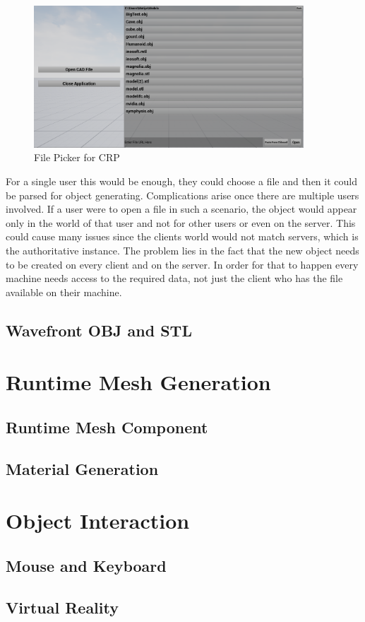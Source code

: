 \begin{figure}[htpb]
	\centering
	\includegraphics[width=0.9\textwidth]{fig/FilePicker2.png}
	\caption[CAD Runtime Presenter File Picker]{File Picker for CRP\protect}
	\label{fig:FilePicker}
\end{figure}

For a single user this would be enough, they could choose a file and then it could be parsed for object generating. Complications arise once there are multiple users involved. If a user were to open a file in such a scenario, the object would appear only in the world of that user and not for other users or even on the server. This could cause many issues since the clients world would not match servers, which is the authoritative instance. The problem lies in the fact that the new object needs to be created on every client and on the server. In order for that to happen every machine needs access to the required data, not just the client who has the file available on their machine.

\subsection{Wavefront OBJ and STL}


\section{Runtime Mesh Generation}
\subsection{Runtime Mesh Component}
\subsection{Material Generation}
\section{Object Interaction}\label{chp:ObjectInteraction}

\subsection{Mouse and Keyboard}

\subsection{Virtual Reality}



